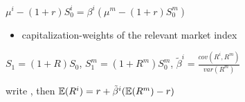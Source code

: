 \begin{prop}
    $\mu^i - (1 + r)S_0^i = \beta^i (\mu^m - (1 + r)S_0^m)$
\end{prop}

\begin{itemize}
    \item capitalization-weights of the relevant market index
\end{itemize}

\begin{setting}

\end{setting}
    $S_1 = (1 + R)S_0$, $S_1^m = (1 + R^m)S_0^m$, $\tilde\beta^i = \frac{cov(R^i, R^m)}{var(R^m)}$
\begin{fact}
    write , then $\mathbb{E}(R^i) = r + \tilde\beta^i(\mathbb{E}(R^m) - r)$
\end{fact}